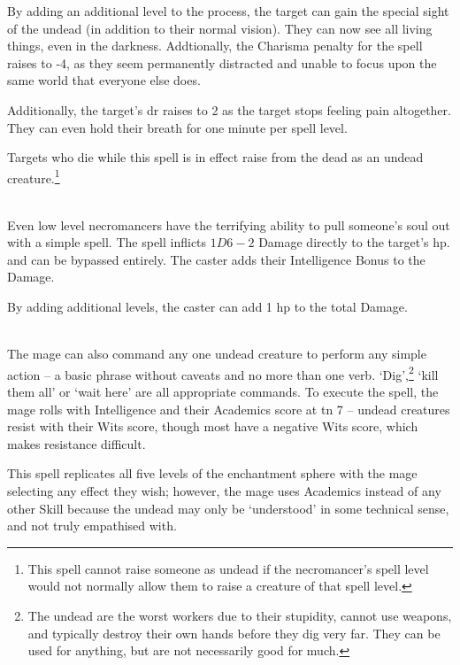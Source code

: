 \begin{multicols}{2}
By adding an additional level to the process, the target can gain the special sight of the undead (in addition to their normal vision).
They can now see all living things, even in the darkness.
Addtionally, the Charisma penalty for the spell raises to -4, as they seem permanently distracted and unable to focus upon the same world that everyone else does.

Additionally, the target's \gls{dr} raises to 2 as the target stops feeling pain altogether.  They can even hold their breath for one minute per spell level.

Targets who die while this spell is in effect raise from the dead as an undead creature.\footnote{This spell cannot raise someone as undead if the necromancer's spell level would not normally allow them to raise a creature of that spell level.}

\\
Even low level necromancers have the terrifying ability to pull someone's soul out with a simple spell.  The spell inflicts $1D6-2$ Damage directly to the target's \gls{hp}.   and  can be bypassed entirely.  The caster adds their Intelligence Bonus to the Damage.


By adding additional levels, the caster can add 1 \gls{hp} to the total Damage.

\\
The mage can also command any one undead creature to perform any simple action -- a basic phrase without caveats and no more than one verb. `Dig',\footnote{The undead are the worst workers due to their stupidity, cannot use weapons, and typically destroy their own hands before they dig very far.  They can be used for anything, but are not necessarily good for much.} `kill them all' or `wait here' are all appropriate commands. To execute the spell, the mage rolls with Intelligence and their Academics score at \gls{tn} 7 -- undead creatures resist with their Wits score, though most have a negative Wits score, which makes resistance difficult.

This spell replicates all five levels of the enchantment sphere with the mage selecting any effect they wish; however, the mage uses Academics instead of any other Skill because the undead may only be `understood' in some technical sense, and not truly empathised with.


\end{multicols}
